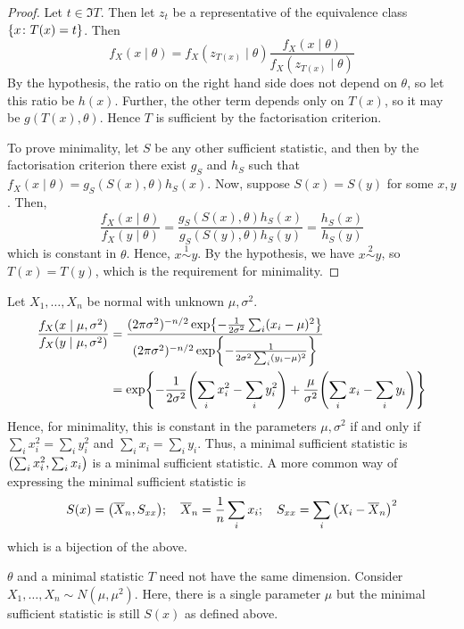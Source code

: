 \begin{proof}
	Let \( t \in \Im T \).
	Then let \( z_t \) be a representative of the equivalence class \( \qty{x \colon T(x) = t} \).
	Then
	\[
		f_X(x \mid \theta) = f_X(z_{T(x)} \mid \theta) \frac{f_X(x \mid \theta)}{f_X(z_{T(x)} \mid \theta)}
	\]
	By the hypothesis, the ratio on the right hand side does not depend on \( \theta \), so let this ratio be \( h(x) \).
	Further, the other term depends only on \( T(x) \), so it may be \( g(T(x), \theta) \).
	Hence \( T \) is sufficient by the factorisation criterion.

	To prove minimality, let \( S \) be any other sufficient statistic, and then by the factorisation criterion there exist \( g_S \) and \( h_S \) such that \( f_X(x \mid \theta) = g_S(S(x), \theta) h_S(x) \).
	Now, suppose \( S(x) = S(y) \) for some \( x, y \).
	Then,
	\[
		\frac{f_X(x \mid \theta)}{f_X(y \mid \theta)} = \frac{g_S(S(x), \theta) h_S(x)}{g_S(S(y), \theta) h_S(y)} = \frac{h_S(x)}{h_S(y)}
	\]
	which is constant in \( \theta \).
	Hence, \( x \overset{1}{\sim} y \).
	By the hypothesis, we have \( x \overset{2}{\sim} y \), so \( T(x) = T(y) \), which is the requirement for minimality.
\end{proof}
\begin{example}
	Let \( X_1, \dots, X_n \) be normal with unknown \( \mu, \sigma^2 \).
	\begin{align*}
		\frac{f_X(x \mid \mu, \sigma^2)}{f_X(y \mid \mu, \sigma^2)} & = \frac{(2 \pi \sigma^2)^{-n/2} \exp{-\frac{1}{2\sigma^2} \sum_i (x_i - \mu)^2}}{(2 \pi \sigma^2)^{-n/2} \exp{-\frac{1}{2\sigma^2 \sum_i (y_i - \mu)^2}}} \\
		                                                            & = \exp{-\frac{1}{2\sigma^2} \qty(\sum_i x_i^2 - \sum_i y_i^2) + \frac{\mu}{\sigma^2} \qty(\sum_i x_i - \sum_i y_i)}
	\end{align*}
	Hence, for minimality, this is constant in the parameters \( \mu, \sigma^2 \) if and only if \( \sum_i x_i^2 = \sum_i y_i^2 \) and \( \sum_i x_i = \sum_i y_i \).
	Thus, a minimal sufficient statistic is \( \qty(\sum_i x_i^2, \sum_i x_i) \) is a minimal sufficient statistic.
	A more common way of expressing the minimal sufficient statistic is
	\[
		S(x) = \qty(\overline X_n, S_{xx});\quad \overline X_n = \frac{1}{n} \sum_i x_i;\quad S_{xx} = \sum_i \qty(X_i - \overline X_n)^2
	\]
	which is a bijection of the above.
\end{example}
\begin{example}
	\( \theta \) and a minimal statistic \( T \) need not have the same dimension.
	Consider \( X_1, \dots, X_n \sim N(\mu, \mu^2) \).
	Here, there is a single parameter \( \mu \) but the minimal sufficient statistic is still \( S(x) \) as defined above.
\end{example}

